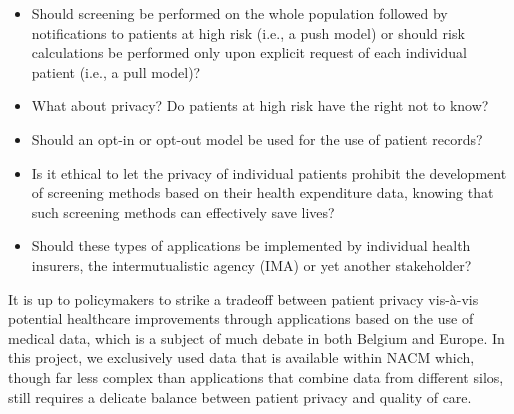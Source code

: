 \begin{itemize}
\item Should screening be performed on the whole population followed by notifications to patients at high risk (i.e., a push model) or should risk calculations be performed only upon explicit request of each individual patient (i.e., a pull model)?
\item What about privacy? Do patients at high risk have the right not to know?
\item Should an opt-in or opt-out model be used for the use of patient records?
\item Is it ethical to let the privacy of individual patients prohibit the development of screening methods based on their health expenditure data, knowing that such screening methods can effectively save lives?
\item Should these types of applications be implemented by individual health insurers, the intermutualistic agency (IMA) or yet another stakeholder?
\end{itemize}

It is up to policymakers to strike a tradeoff between patient privacy vis-\`a-vis potential healthcare improvements through applications based on the use of medical data, which is a subject of much debate in both Belgium and Europe. In this project, we exclusively used data that is available within NACM which, though far less complex than applications that combine data from different silos, still requires a delicate balance between patient privacy and quality of care.


\cleardoublepage


